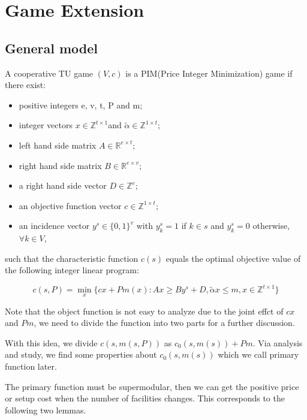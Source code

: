 \section{Game Extension}
\subsection*{General model}

A cooperative TU game $(V,c)$ is a PIM(Price Integer Minimization) game if there exist:

\begin{itemize}
	\item positive integers e, v, t, P and m;
	\item integer vectors $ x \in \mathbb{Z}^{t \times 1} $and $ \tilde{\alpha} \in \mathbb{Z}^{1 \times t} $;
	\item left hand side matrix  $A \in \mathbb{R} ^{e \times t};$
	\item right hand side matrix $B \in \mathbb{R} ^ {e \times v};$
	\item a right hand side vector $D \in \mathbb{Z} ^ {e};$
	\item an objective function vector
	$c \in \mathbb{Z}^{1 \times t};$
	\item an incidence vector $y^s \in \{0,1\}^v$ with $y^s_k = 1$ if $k \in s$ and $y^s_k = 0 $ otherwise, $\forall k \in V$,

\end{itemize}

such that the characteristic function $c(s)$ equals the optimal objective value of the following integer linear program:

\[
c(s,P)= \mathop{\min}_{x} \{ cx+Pm(x): Ax \geq By^s+D, \tilde{\alpha}x \leq m, x \in \mathbb{Z}^{t \times 1} \}
\]

Note that the object function is not easy to analyze due to the joint effct of $cx$ and $Pm$, we need to divide the function into two parts for a further discussion.

With this idea, we divide $c(s,m(s,P))$ as $c_0(s,m(s))+Pm $. Via analysis and study, we find some properties about $c_0(s,m(s)) $ which we call primary function later.

The primary function must be supermodular, then we can get the positive price or setup cost when the number of facilities changes. This corresponds to the following two lemmas.


